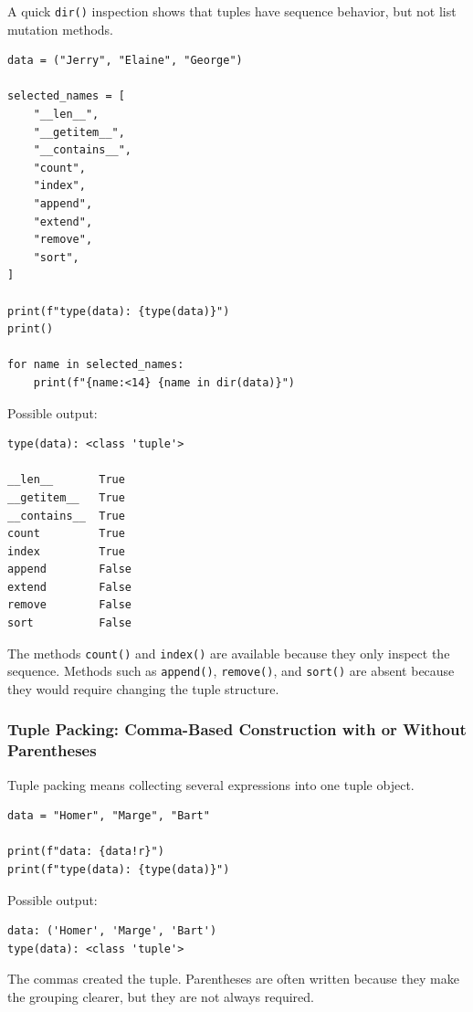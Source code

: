 A quick \texttt{dir()} inspection shows that tuples have sequence behavior, but not list mutation methods.

\begin{verbatim}
data = ("Jerry", "Elaine", "George")

selected_names = [
    "__len__",
    "__getitem__",
    "__contains__",
    "count",
    "index",
    "append",
    "extend",
    "remove",
    "sort",
]

print(f"type(data): {type(data)}")
print()

for name in selected_names:
    print(f"{name:<14} {name in dir(data)}")
\end{verbatim}

Possible output:

\begin{verbatim}
type(data): <class 'tuple'>

__len__       True
__getitem__   True
__contains__  True
count         True
index         True
append        False
extend        False
remove        False
sort          False
\end{verbatim}

The methods \texttt{count()} and \texttt{index()} are available because they only inspect the sequence. Methods such as \texttt{append()}, \texttt{remove()}, and \texttt{sort()} are absent because they would require changing the tuple structure.

\subsubsection{Tuple Packing: Comma-Based Construction with or Without Parentheses}

Tuple packing means collecting several expressions into one tuple object.

\begin{verbatim}
data = "Homer", "Marge", "Bart"

print(f"data: {data!r}")
print(f"type(data): {type(data)}")
\end{verbatim}

Possible output:

\begin{verbatim}
data: ('Homer', 'Marge', 'Bart')
type(data): <class 'tuple'>
\end{verbatim}

The commas created the tuple. Parentheses are often written because they make the grouping clearer, but they are not always required.

